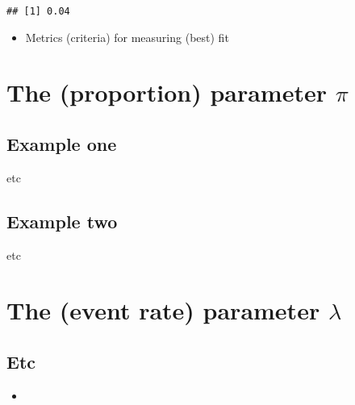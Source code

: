 \documentclass[]{book}
\newenvironment{Shaded}{\begin{snugshade}}{\end{snugshade}}
\newcommand{\DecValTok}[1]{\textcolor[rgb]{0.00,0.00,0.81}{#1}}
\newcommand{\KeywordTok}[1]{\textcolor[rgb]{0.13,0.29,0.53}{\textbf{#1}}}
\newcommand{\NormalTok}[1]{#1}
\newcommand{\OperatorTok}[1]{\textcolor[rgb]{0.81,0.36,0.00}{\textbf{#1}}}
\providecommand{\tightlist}{%
  \setlength{\itemsep}{0pt}\setlength{\parskip}{0pt}}
\begin{document}
\begin{Shaded}
\end{Shaded}

\begin{verbatim}
## [1] 0.04
\end{verbatim}

\begin{itemize}
\tightlist
\item
  Metrics (criteria) for measuring (best) fit
\end{itemize}

\hypertarget{paraPi}{%
\chapter{\texorpdfstring{The (proportion) parameter \(\pi\)}{The (proportion) parameter \textbackslash{}pi}}\label{paraPi}}

\hypertarget{example-one-1}{%
\section{Example one}\label{example-one-1}}

etc

\hypertarget{example-two-1}{%
\section{Example two}\label{example-two-1}}

etc

\hypertarget{paraLambda}{%
\chapter{\texorpdfstring{The (event rate) parameter \(\lambda\)}{The (event rate) parameter \textbackslash{}lambda}}\label{paraLambda}}

\hypertarget{etc-2}{%
\section{Etc}\label{etc-2}}

\begin{itemize}
\item
\end{itemize}
\end{document}
